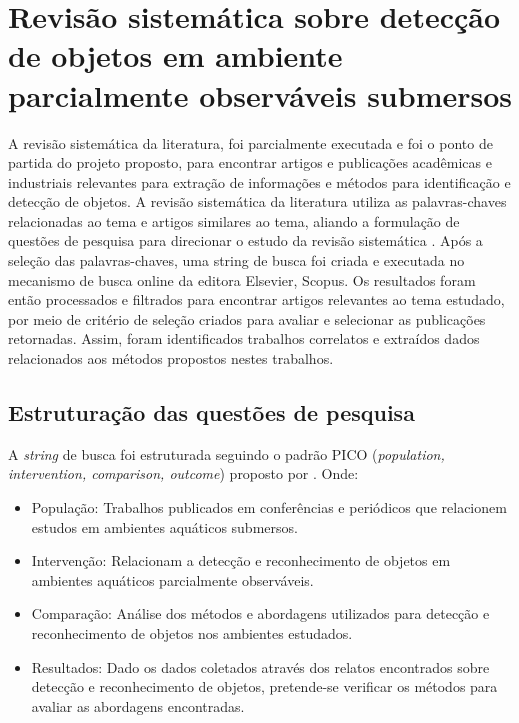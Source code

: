 \section{Revisão sistemática sobre detecção de objetos em ambiente parcialmente observáveis submersos}

  A revisão sistemática da literatura, foi parcialmente executada e foi o ponto de partida do projeto proposto, para encontrar artigos e publicações acadêmicas e industriais relevantes para extração de informações e métodos para identificação e detecção de objetos. A revisão sistemática da literatura utiliza as palavras-chaves relacionadas ao tema e artigos similares ao tema, aliando a formulação de questões de pesquisa para direcionar o estudo da revisão sistemática . Após a seleção das palavras-chaves, uma string de busca foi criada e executada no mecanismo de busca online da editora Elsevier, Scopus. Os resultados foram então processados e filtrados para encontrar artigos relevantes ao tema estudado, por meio de critério de seleção criados para avaliar e selecionar as publicações retornadas. Assim, foram  identificados  trabalhos correlatos e extraídos dados relacionados aos métodos propostos nestes trabalhos.




\subsection{Estruturação das questões de pesquisa}
A \textit{string} de busca foi estruturada seguindo o padrão PICO (\textit{population, intervention, comparison, outcome}) proposto por .
Onde:
 \begin{itemize}
 \item  População: Trabalhos publicados em conferências e periódicos que relacionem estudos em ambientes aquáticos submersos.
 \item Intervenção: Relacionam a detecção e reconhecimento de objetos em ambientes aquáticos parcialmente observáveis.
 \item Comparação:  Análise dos métodos e abordagens utilizados para detecção e reconhecimento de objetos nos ambientes estudados.
 \item Resultados: Dado os dados coletados através dos relatos encontrados sobre detecção e reconhecimento de objetos, pretende-se verificar os métodos para avaliar as abordagens encontradas.
 \end{itemize}

